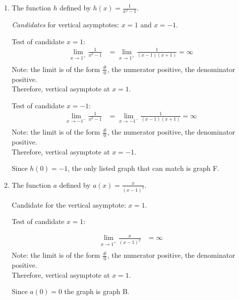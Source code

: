\documentclass{ximera}
\begin{document}
\begin{problem}
\begin{enumerate}
\begin{explanation}
        Since $g(0) = 0$, the only listed graph that can match is graph C.
      \end{explanation}

\item 
      The function $h$ defined by $\displaystyle h(x) = \frac{1}{x^2 -1}$.
\begin{explanation}
        \emph{Candidates} for vertical asymptotes: $x = 1$ and $x = -1$.

        Test of candidate $x = 1$:
        \begin{align*}
          \lim_{x \to 1^+} \frac{1}{x^2 -1} &= \lim_{x \to 1^+} \frac{1}{(x-1)(x+1)} = \infty\\
             \end{align*}
	Note:  the limit is of the form $ \frac{ \#}{0}$, the numerator  positive, the denominator positive. \\
          Therefore, vertical asymptote at $x = 1$.
     

        Test of candidate $x = -1$:
        \begin{align*}
          \lim_{x \to -1^-} \frac{1}{x^2 -1} &= \lim_{x \to -1^-} \frac{1}{(x-1)(x+1)} = \infty\\
            \end{align*}
Note:  the limit is of the form $ \frac{ \#}{0}$, the numerator  positive, the denominator positive. \\
Therefore, vertical asymptote at $x = -1$.
      
        Since $h(0) = -1$, the only listed graph that can match is graph F.
      \end{explanation}

    \item 
      The function $a$ defined by $\displaystyle a(x) = \frac{x}{(x-1)^2}$.
\begin{explanation}
        Candidate for the vertical asymptote: $x = 1$.

        Test of candidate $x = 1$:

        \begin{align*}
          \lim_{x \to 1^+}\frac{x}{(x-1)^2} &= \infty \\
           \end{align*}
	Note: the limit is of the form $ \frac{ \#}{0}$, the numerator positive, the denominator positive.\\
     Therefore, vertical asymptote at $x = 1$.
       
        Since $a(0) = 0$ the graph is graph B.
      \end{explanation}


\end{enumerate}
\end{problem}
\end{document}
